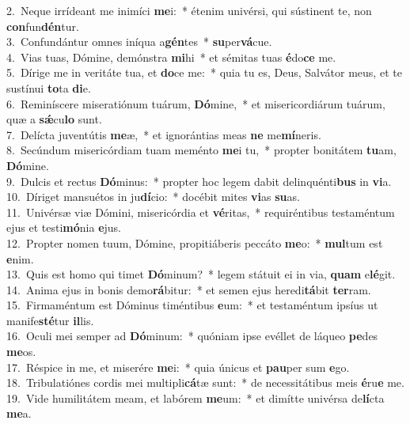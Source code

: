 {2.~}Neque irrídeant me inimíci \textbf{me}i:~* étenim univérsi, qui sústinent te, non \textbf{con}fun\textbf{dén}tur.\\
{3.~}Confundántur omnes iníqua a\textbf{gén}tes~* \textbf{su}per\textbf{vá}cue.\\
{4.~}Vias tuas, Dómine, demónstra \textbf{mi}hi~* et sémitas tuas \textbf{é}do\textbf{ce} me.\\
{5.~}Dírige me in veritáte tua, et \textbf{do}ce me:~* quia tu es, Deus, Salvátor meus, et te sustínui \textbf{to}ta \textbf{di}e.\\
{6.~}Reminíscere miseratiónum tuárum, \textbf{Dó}mine,~* et misericordiárum tuárum, quæ a \textbf{sǽ}cu\textbf{lo} sunt.\\
{7.~}Delícta juventútis \textbf{me}æ,~* et ignorántias meas \textbf{ne} me\textbf{mí}neris.\\
{8.~}Secúndum misericórdiam tuam meménto \textbf{me}i tu,~* propter bonitátem \textbf{tu}am, \textbf{Dó}mine.\\
{9.~}Dulcis et rectus \textbf{Dó}minus:~* propter hoc legem dabit delinquénti\textbf{bus} in \textbf{vi}a.\\
{10.~}Díriget mansuétos in ju\textbf{dí}cio:~* docébit mites \textbf{vi}as \textbf{su}as.\\
{11.~}Univérsæ viæ Dómini, misericórdia et \textbf{vé}ritas,~* requiréntibus testaméntum ejus et testi\textbf{mó}nia \textbf{e}jus.\\
{12.~}Propter nomen tuum, Dómine, propitiáberis peccáto \textbf{me}o:~* \textbf{mul}tum est \textbf{e}nim.\\
{13.~}Quis est homo qui timet \textbf{Dó}minum?~* legem státuit ei in via, \textbf{quam} e\textbf{lé}git.\\
{14.~}Anima ejus in bonis demo\textbf{rá}bitur:~* et semen ejus heredi\textbf{tá}bit \textbf{ter}ram.\\
{15.~}Firmaméntum est Dóminus timéntibus \textbf{e}um:~* et testaméntum ipsíus ut manife\textbf{sté}tur \textbf{il}lis.\\
{16.~}Oculi mei semper ad \textbf{Dó}minum:~* quóniam ipse evéllet de láqueo \textbf{pe}des \textbf{me}os.\\
{17.~}Réspice in me, et miserére \textbf{me}i:~* quia únicus et \textbf{pau}per sum \textbf{e}go.\\
{18.~}Tribulatiónes cordis mei multipli\textbf{cá}tæ sunt:~* de necessitátibus meis \textbf{é}ru\textbf{e} me.\\
{19.~}Vide humilitátem meam, et labórem \textbf{me}um:~* et dimítte univérsa de\textbf{lí}cta \textbf{me}a.\\
